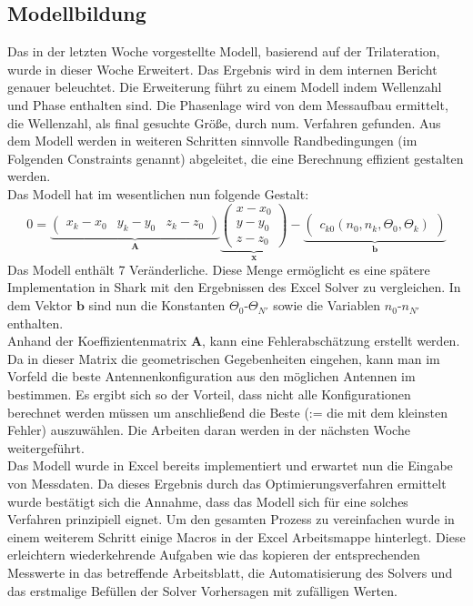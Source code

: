 \documentclass[a4paper,12pt,fleqn]{article}
\begin{document}
\subsection{Modellbildung}
Das in der letzten Woche vorgestellte Modell, basierend auf der Trilateration, wurde in dieser Woche Erweitert. Das Ergebnis wird in dem internen Bericht genauer beleuchtet. Die Erweiterung führt zu einem Modell indem Wellenzahl und Phase enthalten sind. Die Phasenlage wird von dem Messaufbau ermittelt, die Wellenzahl, als final gesuchte Größe, durch num. Verfahren gefunden. Aus dem Modell werden in weiteren Schritten sinnvolle Randbedingungen (im Folgenden Constraints genannt) abgeleitet, die eine Berechnung effizient gestalten werden.\\
%
Das Modell hat im wesentlichen nun folgende Gestalt:
\begin{equation}
0=
\underbrace{\left(
	\begin{array}{ccc}
		x_k-x_0 & y_k-y_0 & z_k-z_0 
	\end{array}
\right)}_{\textbf{A}}
\underbrace{\left(
   \begin{array}{c}
	   x-x_0\\
	   y-y_0\\
	   z-z_0
   \end{array}
\right)}_{\textbf{x}}
-
\underbrace{\left(
	\begin{array}{c}
		c_{k0}(n_0, n_k, \Theta_0, \Theta_k)
	\end{array}
\right)}_{\textbf{b}}
\end{equation}
Das Modell enthält 7 Veränderliche. Diese Menge ermöglicht es eine spätere Implementation in Shark mit den Ergebnissen des Excel Solver zu vergleichen. In dem Vektor $\mathbf{b}$ sind nun  die Konstanten $\Theta_0$-$\Theta_{N'}$ sowie die Variablen $n_0$-$n_{N'}$ enthalten.\\
%
Anhand der Koeffizientenmatrix \textbf{A}, kann eine Fehlerabschätzung erstellt werden. Da in dieser Matrix die geometrischen Gegebenheiten eingehen, kann man im Vorfeld die beste Antennenkonfiguration aus den möglichen Antennen im bestimmen. Es ergibt sich so der Vorteil, dass nicht alle Konfigurationen berechnet werden müssen um anschließend die Beste (:= die mit dem kleinsten Fehler) auszuwählen. Die Arbeiten daran werden in der nächsten Woche weitergeführt.\\
%
Das Modell wurde in Excel bereits implementiert und erwartet nun die Eingabe von Messdaten. Da dieses Ergebnis durch das Optimierungsverfahren ermittelt wurde bestätigt sich die Annahme, dass das Modell sich für eine solches Verfahren prinzipiell eignet. Um den gesamten Prozess zu vereinfachen wurde in einem weiterem Schritt einige Macros in der Excel Arbeitsmappe hinterlegt. Diese erleichtern wiederkehrende Aufgaben wie das kopieren der entsprechenden Messwerte in das betreffende Arbeitsblatt, die Automatisierung des Solvers und das erstmalige Befüllen der Solver Vorhersagen mit zufälligen Werten. \\
\end{document}
